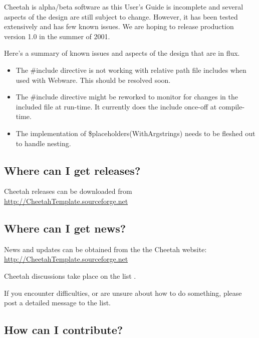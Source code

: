 Cheetah is alpha/beta software as this User's Guide is incomplete and several aspects
of the design are still subject to change.  However, it has been tested
extensively and has few known issues.  We are hoping to release production
version 1.0 in the summer of 2001.

Here's a summary of known issues and aspects of the design that are in flux.
\begin{itemize}
\item The \#include directive is not working with relative path file includes
     when used with Webware. This should be resolved soon.
\item The \#include directive might be reworked to monitor for changes in the
     included file at run-time. It currently does the include once-off at
     compile-time.
\item The implementation of \$placeholders(WithArgstrings) needs to be fleshed
     out to handle nesting.
\end{itemize}

\subsection{Where can I get releases?}
\label{intro.releases}

Cheetah releases can be downloaded from
\url{http://CheetahTemplate.sourceforge.net}

\subsection{Where can I get news?}
\label{intro.news}

News and updates can be obtained from the the Cheetah website:
\url{http://CheetahTemplate.sourceforge.net}

Cheetah discussions take place on the list
.

If you encounter difficulties, or are unsure about how to do something,
please post a detailed message to the list.

\subsection{How can I contribute?}
\label{intro.contribute}

